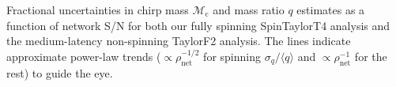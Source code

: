 \label{fig:Mc_q_std_snr} Fractional uncertainties in chirp mass $\mathcal{M}_\mathrm{c}$ and mass ratio $q$ estimates as a function of network S/N for both our fully spinning SpinTaylorT4 analysis and the medium-latency non-spinning TaylorF2 analysis. The lines indicate approximate power-law trends ($\propto \rho_\mathrm{net}^{-1/2}$ for spinning $\sigma_q/\langle q\rangle$ and $\propto \rho_\mathrm{net}^{-1}$ for the rest) to guide the eye.
  
  
  
  
  
  
  